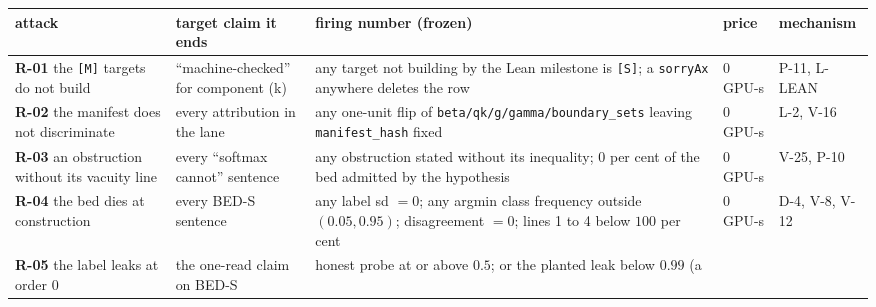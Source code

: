 \documentclass[11pt,a4paper]{article}
\newcounter{none}                 %
\theoremstyle{plain}
\theoremstyle{definition}
\theoremstyle{remark}
\begin{document}
{\def\LTcaptype{none} %
\begin{longtable}[]{@{}
  >{\raggedright\arraybackslash}p{}
  >{\raggedright\arraybackslash}p{}
  >{\raggedright\arraybackslash}p{}
  >{\raggedright\arraybackslash}p{}
  >{\raggedright\arraybackslash}p{}@{}}
\toprule\noalign{}
\begin{minipage}[b]{\linewidth}\raggedright
attack
\end{minipage} & \begin{minipage}[b]{\linewidth}\raggedright
target claim it ends
\end{minipage} & \begin{minipage}[b]{\linewidth}\raggedright
firing number (frozen)
\end{minipage} & \begin{minipage}[b]{\linewidth}\raggedright
price
\end{minipage} & \begin{minipage}[b]{\linewidth}\raggedright
mechanism
\end{minipage} \\
\midrule\noalign{}
\endhead
\bottomrule\noalign{}
\endlastfoot
\textbf{R-01} the \texttt{{[}M{]}} targets do not build &
``machine-checked'' for component (k) & any target not building by the
Lean milestone is \texttt{{[}S{]}}; a \texttt{sorryAx} anywhere deletes
the row & \(0\) GPU-s & P-11, L-LEAN \\
\textbf{R-02} the manifest does not discriminate & every attribution in
the lane & any one-unit flip of \texttt{beta/qk/g/gamma/boundary\_sets}
leaving \texttt{manifest\_hash} fixed & \(0\) GPU-s & L-2, V-16 \\
\textbf{R-03} an obstruction without its vacuity line & every ``softmax
cannot'' sentence & any obstruction stated without its inequality; \(0\)
per cent of the bed admitted by the hypothesis & \(0\) GPU-s & V-25,
P-10 \\
\textbf{R-04} the bed dies at construction & every BED-S sentence & any
label sd \(=0\); any argmin class frequency outside \((0.05,0.95)\);
disagreement \(=0\); lines 1 to 4 below \(100\) per cent & \(0\) GPU-s &
D-4, V-8, V-12 \\
\textbf{R-05} the label leaks at order 0 & the one-read claim on BED-S &
honest probe at or above \(0.5\); or the planted leak below \(0.99\) (a

\end{longtable}}
\end{document}
